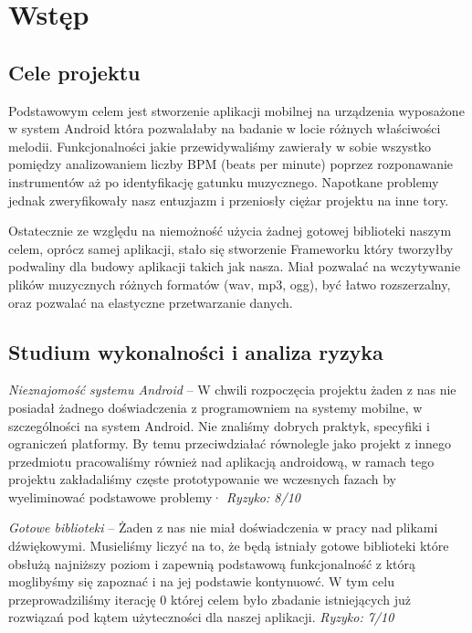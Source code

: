 
\newcommand{\Header}[1]
{\vspace*{4pt}\noindent\textbf{#1}\vspace*{2pt}\par}

\chapter{Wstęp}
\section{Cele projektu}
Podstawowym celem jest stworzenie aplikacji mobilnej na urządzenia wyposażone w system Android która
pozwalałaby na badanie w locie różnych właściwości melodii. Funkcjonalności jakie przewidywaliśmy zawierały w sobie wszystko pomiędzy analizowaniem liczby BPM (beats per minute) poprzez rozponawanie instrumentów aż po identyfikację gatunku muzycznego. Napotkane problemy jednak zweryfikowały nasz entuzjazm i przeniosły ciężar projektu na inne tory.

Ostatecznie ze względu na niemożność użycia żadnej gotowej biblioteki naszym celem, oprócz samej aplikacji, stało się stworzenie Frameworku który tworzyłby podwaliny dla budowy aplikacji takich jak nasza. Miał pozwalać na wczytywanie plików muzycznych różnych formatów (wav, mp3, ogg), być łatwo rozszerzalny, oraz pozwalać na elastyczne przetwarzanie danych.
   
\section{Studium wykonalności i analiza ryzyka}

\noindent\emph{Nieznajomość systemu Android} -- W chwili rozpoczęcia projektu żaden z nas nie posiadał żadnego doświadczenia z programowniem na systemy mobilne, w szczególności na system Android. Nie znaliśmy dobrych praktyk, specyfiki i ograniczeń platformy. By temu przeciwdziałać równolegle jako projekt z innego przedmiotu pracowaliśmy również nad aplikacją androidową, w ramach tego projektu zakładaliśmy częste prototypowanie we wczesnych fazach by wyeliminować podstawowe problemy· \emph{Ryzyko: 8/10}

\noindent\emph{Gotowe biblioteki} -- Żaden z nas nie miał doświadczenia w pracy nad plikami dźwiękowymi. Musieliśmy liczyć na to, że będą istniały gotowe biblioteki które obsłużą najniższy poziom i zapewnią podstawową funkcjonalność z którą moglibyśmy się zapoznać i na jej podstawie kontynuowć. W tym celu przeprowadziliśmy iterację 0 której celem było zbadanie istniejących już rozwiązań pod kątem użyteczności dla naszej aplikacji. \emph{Ryzyko: 7/10}

